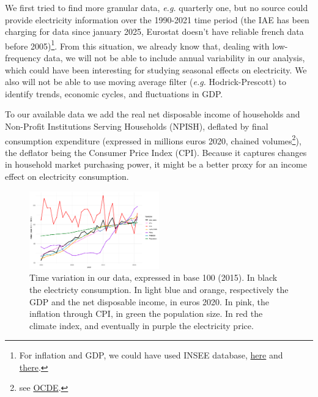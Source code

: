 We first tried to find more granular data, \textit{e.g.} quarterly one, but no source could provide electricity information over the 1990-2021 time period (the IAE has been charging for data since january 2025, Eurostat doesn't have reliable french data before 2005)\footnote{For inflation and GDP, we could have used INSEE database, \href{https://www.insee.fr/fr/statistiques/serie/001763852\#Telechargement}{here} and
\href{https://www.insee.fr/fr/statistiques/8196636?sommaire=8182908\#consulter}{there}.}. From this situation, we already know that, dealing with low-frequency data, we will not be able to include annual variability in our analysis, which could have been interesting for studying seasonal effects on electricity. We also will not be able to use moving average filter (\textit{e.g.} Hodrick-Prescott) to identify trends, economic cycles, and fluctuations in GDP.

To our available data we add the real net disposable income of households and Non-Profit Institutions Serving Households (NPISH), deflated by final consumption expenditure (expressed in millions euros 2020, chained volumes\footnote{see \href{https://data-explorer.oecd.org/vis?pg=0&snb=12&vw=tb&df[ds]=dsDisseminateFinalDMZ&df[id]=DSD_NAAG\%40DF_NAAG_V&df[ag]=OECD.SDD.NAD&df[vs]=1.0&dq=A..B6GS1M_POP..&pd=1970\%2C&to[TIME_PERIOD]=false&lb=bt&lc=fr}{OCDE}.}), the deflator being the Consumer Price Index (CPI). Because it captures changes in household market purchasing power, it might be a better proxy for an income effect on electricity consumption.

\begin{figure}[h]
    \centering
      \includegraphics[width=0.5\textwidth]{Images/data_base100_2015.jpeg}
      \caption{Time variation in our data, expressed in base 100 (2015). In black the electricty consumption. In light blue and orange, respectively the GDP and the net disposable income, in euros 2020. In pink, the inflation through CPI, in green the population size. In red the climate index, and eventually in purple the electricity price.}
    \label{var}
  \end{figure}

